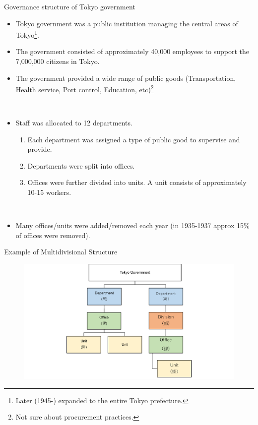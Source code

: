 \begin{frame}{Governance structure of Tokyo government}
    \begin{itemize}
        \item Tokyo government was a public institution managing the central areas of Tokyo\footnote{Later (1945-) expanded to the entire Tokyo prefecture.}.

        \item The government consisted of approximately 40,000 employees to support the 7,000,000 citizens in Tokyo.

        \item The government provided a wide range of public goods (Transportation, Health service, Port control, Education, etc)\footnote{Not sure about procurement practices.}
             

\
        
        \item Staff was allocated to 12 departments. 
        \begin{enumerate}
            \item Each department was assigned a type of public good to supervise and provide.
            \item Departments were split into offices. 
            \item Offices were further divided into units. A unit consists of approximately 10-15 workers.
        \end{enumerate} 
        \

        \item Many offices/units were added/removed each year (in 1935-1937 approx 15\% of offices were removed).
    \end{itemize}

    
    
\end{frame}

\begin{frame}{Example of Multidivisional Structure}
    \begin{figure}
        \centering
        \includegraphics[height=0.8\textheight]{Institutional Background/HierarchyChart.png}
        \label{fig:enter-label}
    \end{figure}
\end{frame}

